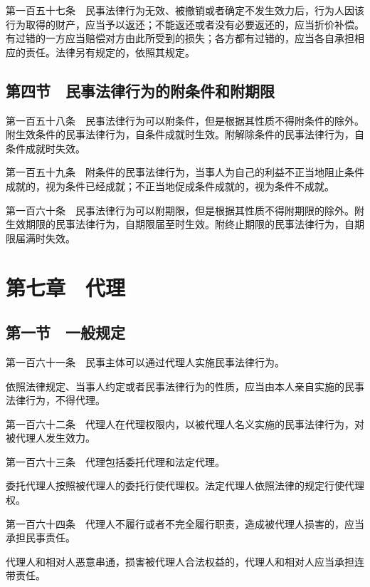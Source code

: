 \documentclass[UTF8,12pt,a4paper]{ctexbook}
\begin{document}
第一百五十七条　民事法律行为无效、被撤销或者确定不发生效力后，行为人因该行为取得的财产，应当予以返还；不能返还或者没有必要返还的，应当折价补偿。有过错的一方应当赔偿对方由此所受到的损失；各方都有过错的，应当各自承担相应的责任。法律另有规定的，依照其规定。

\subsection*{第四节　民事法律行为的附条件和附期限}

第一百五十八条　民事法律行为可以附条件，但是根据其性质不得附条件的除外。附生效条件的民事法律行为，自条件成就时生效。附解除条件的民事法律行为，自条件成就时失效。

第一百五十九条　附条件的民事法律行为，当事人为自己的利益不正当地阻止条件成就的，视为条件已经成就；不正当地促成条件成就的，视为条件不成就。

第一百六十条　民事法律行为可以附期限，但是根据其性质不得附期限的除外。附生效期限的民事法律行为，自期限届至时生效。附终止期限的民事法律行为，自期限届满时失效。

\section*{第七章　代理}

\subsection*{第一节　一般规定}

第一百六十一条　民事主体可以通过代理人实施民事法律行为。

依照法律规定、当事人约定或者民事法律行为的性质，应当由本人亲自实施的民事法律行为，不得代理。

第一百六十二条　代理人在代理权限内，以被代理人名义实施的民事法律行为，对被代理人发生效力。

第一百六十三条　代理包括委托代理和法定代理。

委托代理人按照被代理人的委托行使代理权。法定代理人依照法律的规定行使代理权。

第一百六十四条　代理人不履行或者不完全履行职责，造成被代理人损害的，应当承担民事责任。

代理人和相对人恶意串通，损害被代理人合法权益的，代理人和相对人应当承担连带责任。

\end{document}
